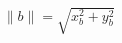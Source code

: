 \documentclass[preview]{standalone}
\begin{document}
\begin{align*}
\| b \| = \sqrt{x_b^2 + y_b^2}
\end{align*}
\end{document}
